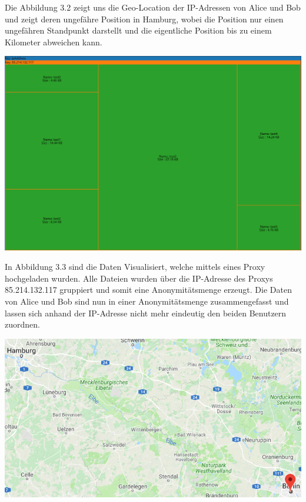 \documentclass[
    fontsize=12pt,
    headings=small,
    parskip=half,           %
    bibliography=totoc,
    numbers=noenddot,       %
    open=any,               %
    ]{scrreprt}
\begin{document}
Die Abbildung 3.2 zeigt uns die Geo-Location der IP-Adressen von Alice und Bob und zeigt deren ungefähre Position in Hamburg, 
wobei die Position nur einen ungefähren Standpunkt darstellt und die eigentliche Position bis zu einem Kilometer abweichen kann.

\begin{center}
\includegraphics[width=\textwidth]{../pic/IP-Proxy-SetB-tree.png}\\
\end{center}

In Abbildung 3.3 sind die Daten Visualisiert, welche mittels eines Proxy hochgeladen wurden. 
Alle Dateien wurden über die IP-Adresse des Proxys 85.214.132.117 gruppiert und somit eine Anonymitätsmenge erzeugt.
Die Daten von Alice und Bob sind nun in einer Anonymitätsmenge zusammengefasst und lassen sich anhand der IP-Adresse nicht mehr eindeutig den beiden Benutzern zuordnen.

\begin{center}
\includegraphics[width=\textwidth]{../pic/IP-Proxy-SetB.png}\\
\end{center}
\end{document}
